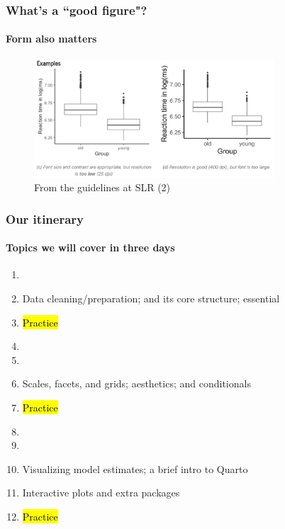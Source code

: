 \documentclass[xcolor=dvipsnames, handout, onlymath, 10pt, aspectratio=169]{beamer}
\begin{document}
\begin{frame}
	\frametitle{What's a ``good figure"?}
	\framesubtitle{Form also matters}

	\begin{figure}
		\begin{center}
			\includegraphics[width=0.8\textwidth]{slr_figures_2.png}
		\end{center}
		\caption{From the guidelines at SLR (2)}\label{fig:slr2}
	\end{figure}

\end{frame}

\begin{frame}
	\frametitle{Our itinerary}
	\framesubtitle{Topics we will cover in three days}

	\begin{enumerate}
		\itemsep=0.5pt
		\item {}
		\item [] Data cleaning/preparation;  and its core structure; essential 
		\item [] \hl{Practice}
		\item []
		\item {}
		\item [] Scales, facets, and grids; aesthetics;  and conditionals
		\item [] \hl{Practice}
		\item []
		\item {}
		\item [] Visualizing model estimates; a brief intro to Quarto
		\item [] Interactive plots and extra packages
		\item[] \hl{Practice}
	\end{enumerate}


\end{frame}
\end{document}
